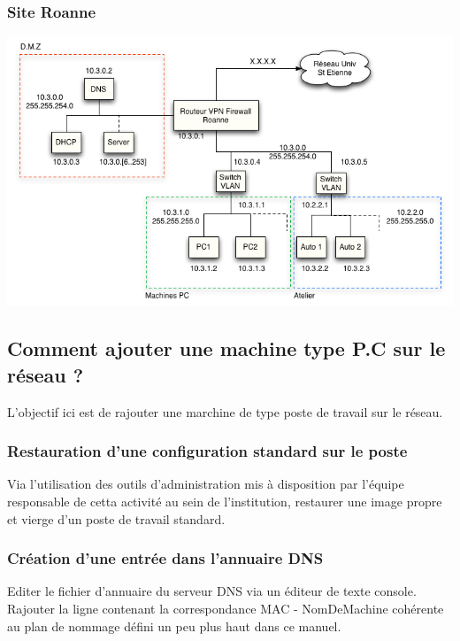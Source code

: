 \documentclass[a4paper]{article}
\begin{document}
\subsubsection{Site Roanne}

\begin{center}
\includegraphics[scale=0.6]{SiteRoanne.png}
\end{center}

\subsection{Comment ajouter une machine type P.C sur le réseau ?}

L'objectif ici est de rajouter une marchine de type poste de travail sur le réseau.

\subsubsection{Restauration d'une configuration standard sur le poste}

Via l'utilisation des outils d'administration mis à disposition par l'équipe responsable de cetta activité au sein de l'institution, restaurer une image propre et vierge d'un poste de travail standard.

\subsubsection{Création d'une entrée dans l'annuaire DNS}

Editer le fichier d'annuaire du serveur DNS via un éditeur de texte console.
Rajouter la ligne contenant la correspondance MAC - NomDeMachine cohérente au plan de nommage défini un peu plus haut dans ce 
manuel.
\end{document}
